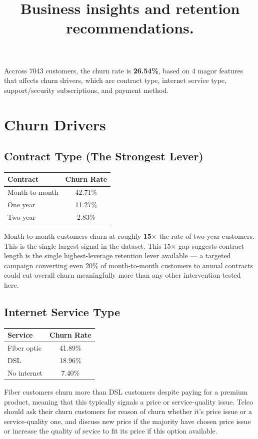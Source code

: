 \documentclass[11pt]{article}
\title{\vspace{-1.5cm}\textbf{Business insights and retention recommendations.}}
\date{} %
\begin{document}
\maketitle
\thispagestyle{fancy}

Accross 7043 customers, the churn rate is \textbf{26.54\%}, based on 4 magor features that affects  churn drivers, which are contract type, internet service
type, support/security subscriptions, and payment method.
\section*{Churn Drivers}

\subsection*{Contract Type (The Strongest Lever)}
\begin{center}
\begin{tabular}{lc}
\toprule
\textbf{Contract} & \textbf{Churn Rate} \\
\midrule
Month-to-month & 42.71\% \\
One year & 11.27\% \\
Two year & 2.83\% \\
\bottomrule
\end{tabular}
\end{center}
Month-to-month customers churn at roughly \textbf{15$\times$} the rate of two-year customers. This is the single largest signal in the dataset. This 15× gap suggests contract length is the single highest-leverage retention lever available — a targeted campaign converting even 20\% of month-to-month customers to annual contracts could cut overall churn meaningfully more than any other intervention tested here.

\subsection*{Internet Service Type}
\begin{center}
\begin{tabular}{lc}
\toprule
\textbf{Service} & \textbf{Churn Rate} \\
\midrule
Fiber optic & 41.89\% \\
DSL & 18.96\% \\
No internet & 7.40\% \\
\bottomrule
\end{tabular}
\end{center}
Fiber customers churn more than DSL customers despite paying for a premium product, meaning that this typically signals a price or service-quality issue. Telco should ask their churn customers for reason of churn whether it's price issue or a service-quality one, and discuss new price if the majority have chosen price issue or increase the quality of sevice to fit its price if this option available.
\end{document}
